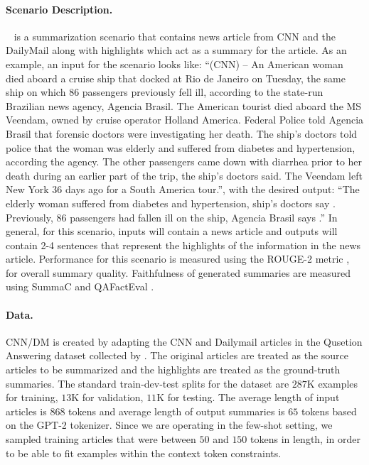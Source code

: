 \paragraph{Scenario Description.}
\cnndm~\citep{hermann2015read} is a summarization scenario that contains news article from CNN and the DailyMail along with highlights which act as a summary for the article.
As an example, an input for the scenario looks like: ``(CNN) -- An American woman died aboard a cruise ship that docked at Rio de Janeiro on Tuesday, the same ship on which 86 passengers previously fell ill, according to the state-run Brazilian news agency, Agencia Brasil. The American tourist died aboard the MS Veendam, owned by cruise operator Holland America. Federal Police told Agencia Brasil that forensic doctors were investigating her death. The ship's doctors told police that the woman was elderly and suffered from diabetes and hypertension, according the agency. The other passengers came down with diarrhea prior to her death during an earlier part of the trip, the ship's doctors said. The Veendam left New York 36 days ago for a South America tour.'', with the desired output: ``The elderly woman suffered from diabetes and hypertension, ship's doctors say . Previously, 86 passengers had fallen ill on the ship, Agencia Brasil says .''
In general, for this scenario, inputs will contain a news article and outputs will contain 2-4 sentences that represent the highlights of the information in the news article.
Performance for this scenario is measured using the ROUGE-2 metric \citep{lin-2004-rouge}, for overall summary quality. Faithfulness of generated summaries are measured using SummaC \citep{10.1162/tacl_a_00453} and QAFactEval \citep{fabbri-etal-2022-qafacteval}.

\paragraph{Data.}
CNN/DM is created by adapting the CNN and Dailymail articles in the Qusetion Answering dataset collected by \citet{hermann2015read}. 
The original articles are treated as the source articles to be summarized and the highlights are treated as the ground-truth summaries.
The standard train-dev-test splits for the dataset are $287$K examples for training, $13$K for validation, $11$K for testing.
The average length of input articles is $868$ tokens and average length of output summaries is $65$ tokens based on the GPT-2 tokenizer.
Since we are operating in the few-shot setting, we sampled training articles that were between $50$ and $150$ tokens in length, in order to be able to fit examples within the context token constraints.

